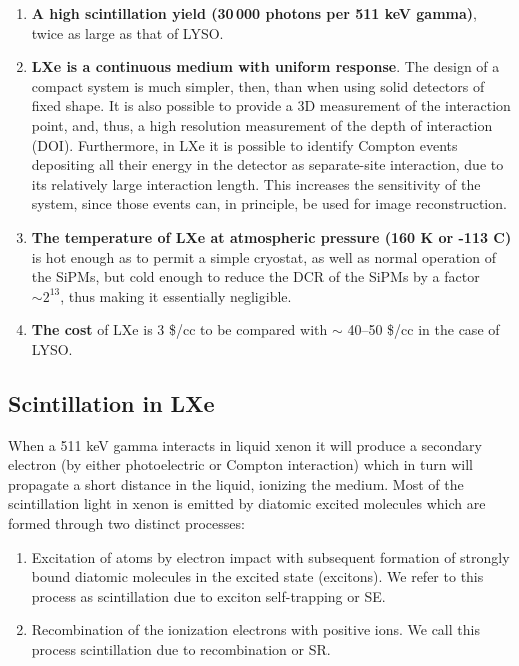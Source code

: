 \documentclass[11pt,a4paper]{article}
\begin{document}
\begin{enumerate}
\item {\bf A high scintillation yield (30\,000 photons per 511 keV gamma)}, twice as large as that of LYSO. 
\item {\bf LXe is a continuous medium with uniform response}. The design of a compact system is much simpler, then, than when using solid detectors of fixed shape. It is also possible to provide a 3D measurement of the interaction point, and, thus, a high resolution measurement of the depth of interaction (DOI). Furthermore, in LXe it is possible to identify Compton events depositing all their energy in the detector as separate-site interaction, due to its relatively large interaction length. This increases the sensitivity of the system, since those events can, in principle, be used for image reconstruction. 
\item {\bf The temperature of LXe at atmospheric pressure (160 K or -113 C)} is hot enough as to permit a simple cryostat, as well as normal operation of the SiPMs, but cold enough to reduce the DCR of the SiPMs by a factor $\sim 2^{13}$, thus making it essentially negligible. 
\item {\bf The cost} of LXe is 3 \$/cc to be compared with $\sim$ 40--50 \$/cc in the case of LYSO. 
 \end{enumerate}

\subsection*{Scintillation in LXe} \label{sec.scint}

When a 511 keV gamma interacts in liquid xenon it will produce a secondary electron (by either photoelectric or Compton interaction) which in turn will propagate a short distance in the liquid, ionizing the medium. Most of the scintillation light in xenon is emitted by diatomic excited molecules which are formed through two distinct processes:
\begin{enumerate}
\item Excitation of atoms by electron impact with subsequent formation of strongly bound diatomic molecules in the excited state (excitons). We refer to this process as scintillation due to exciton self-trapping or SE.
\item Recombination of the ionization electrons with positive ions. We call this process scintillation due to recombination or SR. 
\end{enumerate}
\end{document}
